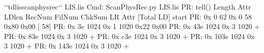 \documentclass[letterpaper,10pt,english]{sphinxmanual}
\begin{document}
\begin{sphinxVerbatim}[commandchars=\\\{\}]
\PYGZdl{} {}`{}`tdlisscanphysrec{}`{}` LIS.lis
Cmd: ScanPhysRec.py LIS.lis
PR:     tell()  Length    Attr  LD\PYGZus{}len  RecNum  FilNum  ChkSum   LR Attr [Total LD]
\PYGZhy{}\PYGZhy{}\PYGZhy{}\PYGZhy{}\PYGZhy{}\PYGZhy{}\PYGZhy{}\PYGZhy{}\PYGZhy{}\PYGZhy{}\PYGZhy{}\PYGZhy{}\PYGZhy{}\PYGZhy{}\PYGZhy{}\PYGZhy{}\PYGZhy{}\PYGZhy{}\PYGZhy{}\PYGZhy{}\PYGZhy{}\PYGZhy{}\PYGZhy{}\PYGZhy{}\PYGZhy{}\PYGZhy{}\PYGZhy{}\PYGZhy{}\PYGZhy{}\PYGZhy{}\PYGZhy{}\PYGZhy{}\PYGZhy{}\PYGZhy{}\PYGZhy{}\PYGZhy{}\PYGZhy{}\PYGZhy{} start \PYGZhy{}\PYGZhy{}\PYGZhy{}\PYGZhy{}\PYGZhy{}\PYGZhy{}\PYGZhy{}\PYGZhy{}\PYGZhy{}\PYGZhy{}\PYGZhy{}\PYGZhy{}\PYGZhy{}\PYGZhy{}\PYGZhy{}\PYGZhy{}\PYGZhy{}\PYGZhy{}\PYGZhy{}\PYGZhy{}\PYGZhy{}\PYGZhy{}\PYGZhy{}\PYGZhy{}\PYGZhy{}\PYGZhy{}\PYGZhy{}\PYGZhy{}\PYGZhy{}\PYGZhy{}\PYGZhy{}\PYGZhy{}\PYGZhy{}\PYGZhy{}\PYGZhy{}\PYGZhy{}\PYGZhy{}\PYGZhy{}
PR: 0x       0      62  0x   0      58  \PYGZhy{}\PYGZhy{}\PYGZhy{}\PYGZhy{}\PYGZhy{}\PYGZhy{}  \PYGZhy{}\PYGZhy{}\PYGZhy{}\PYGZhy{}\PYGZhy{}\PYGZhy{}  \PYGZhy{}\PYGZhy{}\PYGZhy{}\PYGZhy{}\PYGZhy{}\PYGZhy{} 0x80 0x00 [      58]
PR: 0x      3e    1024  0x   1    1020  \PYGZhy{}\PYGZhy{}\PYGZhy{}\PYGZhy{}\PYGZhy{}\PYGZhy{}  \PYGZhy{}\PYGZhy{}\PYGZhy{}\PYGZhy{}\PYGZhy{}\PYGZhy{}  \PYGZhy{}\PYGZhy{}\PYGZhy{}\PYGZhy{}\PYGZhy{}\PYGZhy{} 0x22 0x00
PR: 0x     43e    1024  0x   3    1020  \PYGZhy{}\PYGZhy{}\PYGZhy{}\PYGZhy{}\PYGZhy{}\PYGZhy{}  \PYGZhy{}\PYGZhy{}\PYGZhy{}\PYGZhy{}\PYGZhy{}\PYGZhy{}  \PYGZhy{}\PYGZhy{}\PYGZhy{}\PYGZhy{}\PYGZhy{}\PYGZhy{} + \PYGZhy{}\PYGZhy{}   \PYGZhy{}\PYGZhy{}
PR: 0x     83e    1024  0x   3    1020  \PYGZhy{}\PYGZhy{}\PYGZhy{}\PYGZhy{}\PYGZhy{}\PYGZhy{}  \PYGZhy{}\PYGZhy{}\PYGZhy{}\PYGZhy{}\PYGZhy{}\PYGZhy{}  \PYGZhy{}\PYGZhy{}\PYGZhy{}\PYGZhy{}\PYGZhy{}\PYGZhy{} + \PYGZhy{}\PYGZhy{}   \PYGZhy{}\PYGZhy{}
PR: 0x     c3e    1024  0x   3    1020  \PYGZhy{}\PYGZhy{}\PYGZhy{}\PYGZhy{}\PYGZhy{}\PYGZhy{}  \PYGZhy{}\PYGZhy{}\PYGZhy{}\PYGZhy{}\PYGZhy{}\PYGZhy{}  \PYGZhy{}\PYGZhy{}\PYGZhy{}\PYGZhy{}\PYGZhy{}\PYGZhy{} + \PYGZhy{}\PYGZhy{}   \PYGZhy{}\PYGZhy{}
PR: 0x    103e    1024  0x   3    1020  \PYGZhy{}\PYGZhy{}\PYGZhy{}\PYGZhy{}\PYGZhy{}\PYGZhy{}  \PYGZhy{}\PYGZhy{}\PYGZhy{}\PYGZhy{}\PYGZhy{}\PYGZhy{}  \PYGZhy{}\PYGZhy{}\PYGZhy{}\PYGZhy{}\PYGZhy{}\PYGZhy{} + \PYGZhy{}\PYGZhy{}   \PYGZhy{}\PYGZhy{}
PR: 0x    143e    1024  0x   3    1020  \PYGZhy{}\PYGZhy{}\PYGZhy{}\PYGZhy{}\PYGZhy{}\PYGZhy{}  \PYGZhy{}\PYGZhy{}\PYGZhy{}\PYGZhy{}\PYGZhy{}\PYGZhy{}  \PYGZhy{}\PYGZhy{}\PYGZhy{}\PYGZhy{}\PYGZhy{}\PYGZhy{} + \PYGZhy{}\PYGZhy{}   \PYGZhy{}\PYGZhy{}

\end{sphinxVerbatim}
\end{document}
